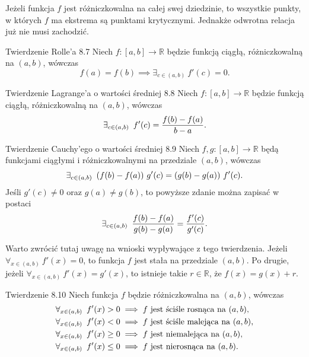 \documentclass{article}
\newcommand{\hquad}{\mkern9mu}
\newcommand{\R}{\mathbb{R}}
\begin{document}
Jeżeli funkcja $f$ jest różniczkowalna na całej swej dziedzinie, to wszystkie punkty, w których $f$ ma ekstrema są punktami krytycznymi. Jednakże odwrotna relacja już nie musi zachodzić. 

\begin{twier}{Twierdzenie Rolle'a 8.7}
    Niech $f:[a,b]\to\R$ będzie funkcją ciągłą, różniczkowalną na $(a,b)$, wówczas
    \begin{equation*}
        f(a)=f(b)\implies\exists_{c\in(a,b)}\ f'(c)=0.
    \end{equation*}
\end{twier}

\begin{twier}{Twierdzenie Lagrange'a o wartości średniej 8.8}
    Niech $f:[a,b]\to\R$ będzie funkcją ciągłą, różniczkowalną na $(a,b)$, wówczas
    \begin{equation*}
        \exists_{c\in(a,b)}\hquad f'(c)=\frac{f(b)-f(a)}{b-a}.
    \end{equation*}
\end{twier}

\begin{twier}{Twierdzenie Cauchy'ego o wartości średniej 8.9}
    Niech $f,g:[a,b]\to\R$ będą funkcjami ciągłymi i różniczkowalnymi na przedziale $(a,b)$, wówczas
    \begin{equation*}
        \exists_{c\in(a,b)}\hquad (f(b)-f(a))\ g'(c) = (g(b)-g(a))\ f'(c).
    \end{equation*}
    Jeśli $g'(c)\neq0$ oraz $g(a)\neq g(b)$, to powyższe zdanie można zapisać w postaci
    \begin{equation*}
        \exists_{c\in(a,b)}\hquad \frac{f(b)-f(a)}{g(b)-g(a)}=\frac{f'(c)}{g'(c)}.
    \end{equation*}
\end{twier}

Warto zwrócić tutaj uwagę na wnioski wypływające z tego twierdzenia. Jeżeli $\forall_{x\in(a,b)}\ f'(x)=0$, to funkcja $f$ jest stała na przedziale $(a,b)$. Po drugie, jeżeli $\forall_{x\in(a,b)}\ f'(x)=g'(x)$, to istnieje takie $r\in\R$, że $f(x)=g(x)+r$.

\begin{twier}{Twierdzenie 8.10}
Niech funkcja $f$ będzie różniczkowalna na $(a,b)$, wówczas
    \begin{align*}
        \forall_{x\in(a,b)}\hquad f'(x)>0&\implies\text{$f$ jest ściśle rosnąca na $(a,b)$},\\
        \forall_{x\in(a,b)}\hquad f'(x)<0&\implies\text{$f$ jest ściśle malejąca na $(a,b)$},\\
        \forall_{x\in(a,b)}\hquad f'(x)\ge0&\implies\text{$f$ jest niemalejąca na $(a,b)$},\\
        \forall_{x\in(a,b)}\hquad f'(x)\le0&\implies\text{$f$ jest nierosnąca na $(a,b)$}.
    \end{align*}
\end{twier}
\end{document}
